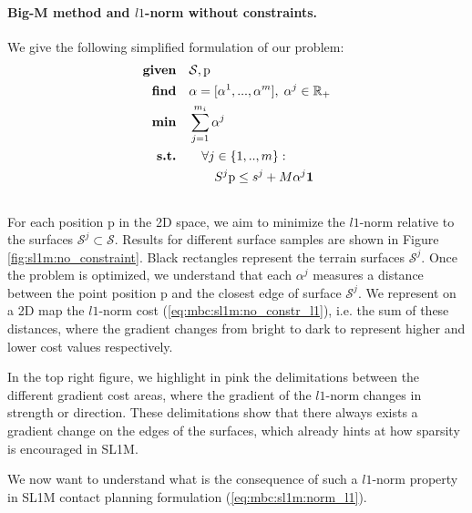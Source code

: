 \paragraph{Big-M method and $l1$-norm without constraints.}
We give the following simplified formulation of our problem:
\begin{align}
    \textrm{\textbf{given}} \quad & \mathcal{S}, \mbox{p} \nonumber\\
    \textrm{\textbf{find}}  \quad & \alpha=[\alpha^1,...,\alpha^m],\; \alpha^j \in \mathbb{R}_{+} \nonumber\\
    \textrm{\textbf{min}}  \quad & \sum_{j=1}^{m_i} \alpha^j \label{eq:mbc:sl1m:no_constr_l1}\\
    \textrm{\textbf{s.t.}}  \quad & \quad \forall j \in \{1,..,m\} : \nonumber\\
                            \quad & \quad \quad S^j \mbox{p} \leq s^j + M \alpha^j \textbf{1} \nonumber\\
                            \nonumber
\end{align}
For each position p in the 2D space, we aim to minimize the $l1$-norm relative to the surfaces $\mathcal{S}^j \subset \mathcal{S}$. 
Results for different surface samples are shown in Figure \ref{fig:sl1m:no_constraint}.
Black rectangles represent the terrain surfaces $\mathcal{S}^j$.
Once the problem is optimized, we understand that each $\alpha^j$ measures a distance between the point position p and the closest edge of surface $\mathcal{S}^j$.
We represent on a 2D map the $l1$-norm cost (\ref{eq:mbc:sl1m:no_constr_l1}), i.e. the sum of these distances, where the gradient changes from bright to dark to represent higher and lower cost values respectively.

In the top right figure, we highlight in pink the delimitations between the different gradient cost areas, where the gradient of the $l1$-norm changes in strength or direction.
These delimitations show that there always exists a gradient change on the edges of the surfaces, which already hints at how sparsity is encouraged in SL1M.

We now want to understand what is the consequence of such a $l1$-norm property in SL1M contact planning formulation (\ref{eq:mbc:sl1m:norm_l1}).

